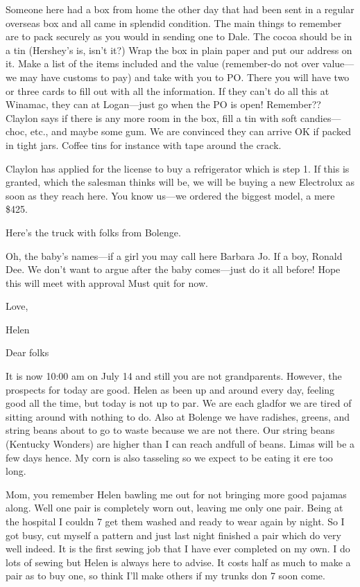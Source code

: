 \documentclass[
]{book}
\begin{document}
Someone here had a box from home the other day that had been sent in a regular overseas box and all came in splendid condition. The main things to remember are to pack securely as you would in sending one to Dale. The cocoa should be in a tin (Hershey's is, isn't it?) Wrap the box in plain paper and put our address on it. Make a list of the items included and the value (remember-do not over value---we may have customs to pay) and take with you to PO. There you will have two or three cards to fill out with all the information. If they can't do all this at Winamac, they can at Logan---just go when the PO is open! Remember?? Claylon says if there is any more room in the box, fill a tin with soft candies---choc, etc., and maybe some gum. We are convinced they can arrive OK if packed in tight jars. Coffee tins for instance with tape around the crack.

Claylon has applied for the license to buy a refrigerator which is step 1. If this is granted, which the salesman thinks will be, we will be buying a new Electrolux as soon as they reach here. You know us---we ordered the biggest model, a mere \$425.

Here's the truck with folks from Bolenge.

Oh, the baby's names---if a girl you may call here Barbara Jo. If a boy, Ronald Dee. We don't want to argue after the baby comes---just do it all before! Hope this will meet with approval Must quit for now.

Love,

Helen

Dear folks

It is now 10:00 am on July 14 and still you are not grandparents. However, the prospects for today are good. Helen as been up and around every day, feeling good all the time, but today is not up to par. We are each gladfor we are tired of sitting around with nothing to do. Also at Bolenge we have radishes, greens, and string beans about to go to waste because we are not there. Our string beans (Kentucky Wonders) are higher than I can reach andfull of beans. Limas will be a few days hence. My corn is also tasseling so we expect to be eating it ere too long.

Mom, you remember Helen bawling me out for not bringing more good pajamas along. Well one pair is completely worn out, leaving me only one pair. Being at the hospital I couldn 7 get them washed and ready to wear again by night. So I got busy, cut myself a pattern and just last night finished a pair which do very well indeed. It is the first sewing job that I have ever completed on my own. I do lots of sewing but Helen is always here to advise. It costs half as much to make a pair as to buy one, so think I'll make others if my trunks don 7 soon come.
\end{document}
